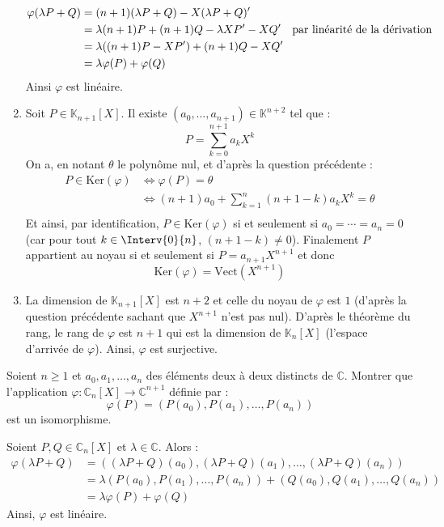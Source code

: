 \documentclass[a4paper,10pt]{report}
\begin{document}
\begin{enumerate}
\begin{align*}
\varphi(\lambda P + Q) & = (n+1)(\lambda P+Q)-X(\lambda P + Q)' \\
& = \lambda (n+1)P + (n+1)Q - \lambda X P' - XQ' \quad \hbox{par linéarité de la dérivation} \\
& = \lambda ((n+1)P-XP') + (n+1)Q-XQ' \\
& = \lambda \varphi(P) + \varphi(Q) 
\end{align*}
Ainsi $\varphi$ est linéaire.
\item Soit $P \in \mathbb{K}_{n+1}[X]$. Il existe $(a_0, \ldots, a_{n+1}) \in \mathbb{K}^{n+2}$ tel que :
$$ P = \sum_{k=0}^{n+1} a_k X^k $$
On a, en notant $\theta$ le polynôme nul, et d'après la question précédente : 
\begin{align*}
P \in \textrm{Ker}(\varphi) & \Longleftrightarrow  \varphi(P) = \theta \\
& \Longleftrightarrow (n+1) a_0 + \sum_{k=1}^n (n+1-k) a_k X^k =\theta  \\
\end{align*}
Et ainsi, par identification, $P \in \textrm{Ker}(\varphi)$ si et seulement si $a_0 = \cdots = a_n = 0$ (car pour tout $k \in \Interv{0}{n}$, $(n+1-k) \neq 0$). Finalement $P$ appartient au noyau si et seulement si $P = a_{n+1} X^{n+1}$ et donc 
$$\textrm{Ker}(\varphi)= \textrm{Vect}(X^{n+1})$$
\item La dimension de $\mathbb{K}_{n+1}[X]$ est $n+2$ et celle du noyau de $\varphi$ est $1$ (d'après la question précédente sachant que $X^{n+1}$ n'est pas nul). D'après le théorème du rang, le rang de $\varphi$ est $n+1$ qui est la dimension de $\mathbb{K}_n[X]$ (l'espace d'arrivée de $\varphi$). Ainsi, $\varphi$ est surjective.
\end{enumerate}

\medskip


\begin{Exercice}{} Soient $n \geq 1$ et $a_{0} ,a_{1} , \ldots ,a_{n}$ des éléments deux à deux distincts de $\mathbb{C}$. Montrer que l'application $\varphi \colon \mathbb{C}_n[X] \rightarrow \mathbb{C}^{n+1}$ définie par :
  \[
  \varphi(P) = (P(a_{0}),P(a_{1}), \ldots ,P(a_{n}))
  \]
  est un isomorphisme.
\end{Exercice}

\corr Soient $P,Q \in \mathbb{C}_n[X]$ et $\lambda \in \mathbb{C}$. Alors :
\begin{align*}
\varphi(\lambda P + Q ) & = ((\lambda P+Q)(a_{0}),(\lambda P+Q)(a_{1}), \ldots , (\lambda P+Q)(a_{n})) \\
& = \lambda (P(a_{0}),P(a_{1}), \ldots ,P(a_{n})) + (Q(a_{0}),Q(a_{1}), \ldots ,Q(a_{n})) \\
& = \lambda \varphi(P) + \varphi(Q)
\end{align*}
Ainsi, $\varphi$ est linéaire.
\end{document}
